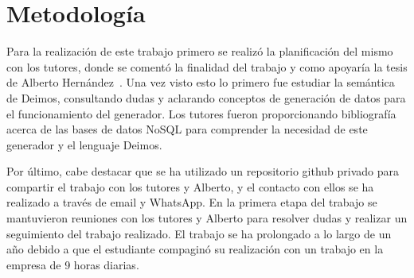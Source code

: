 \section{Metodología}






Para la realización de este trabajo primero se realizó la planificación del mismo con los tutores, donde se comentó la finalidad del trabajo y como apoyaría la tesis de Alberto Hernández~\cite{deimosAlberto}. Una vez visto esto lo primero fue estudiar la semántica de Deimos, consultando dudas y aclarando conceptos de generación de datos para el funcionamiento del generador. Los tutores fueron proporcionando bibliografía acerca de las bases de datos NoSQL para comprender la necesidad de este generador y el lenguaje Deimos.

Por último, cabe destacar que se ha utilizado un repositorio github privado para compartir el trabajo con los tutores y Alberto, y el contacto con ellos se ha realizado a través de email y WhatsApp. En la primera etapa del trabajo se mantuvieron reuniones con los tutores y Alberto para resolver dudas y realizar un seguimiento del trabajo realizado. El trabajo se ha prolongado a lo largo de un año debido a que el estudiante compaginó su realización con un trabajo en la empresa de 9 horas diarias.

